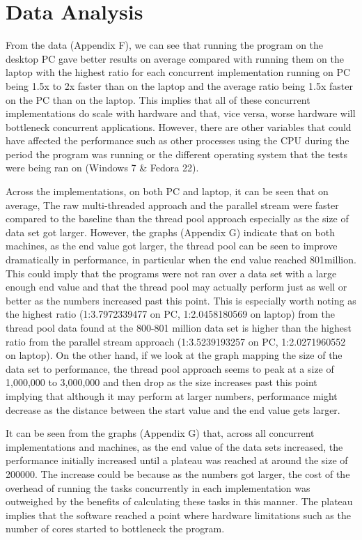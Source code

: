 \documentclass[]{report}
\begin{document}
\section{Data Analysis}

From the data (Appendix F), we can see that running the program on the desktop PC gave better results on average compared with running them on the laptop with the highest ratio for each concurrent implementation running on PC being 1.5x to 2x faster than on the laptop and the average ratio being 1.5x faster on the PC than on the laptop. This implies that all of these concurrent implementations do scale with hardware and that, vice versa, worse hardware will bottleneck concurrent applications. However, there are other variables that could have affected the performance such as other processes using the CPU during the period the program was running or the different operating system that the tests were being ran on (Windows 7 \& Fedora 22).

Across the implementations, on both PC and laptop, it can be seen that on average, The raw multi-threaded approach and the parallel stream were faster compared to the baseline than the thread pool approach especially as the size of data set got larger. However, the graphs (Appendix G) indicate that on both machines, as the end value got larger, the thread pool can be seen to improve dramatically in performance, in particular when the end value reached 801million. This could imply that the programs were not ran over a data set with a large enough end value and that the thread pool may actually perform just as well or better as the numbers increased past this point. This is especially worth noting as the highest ratio (1:3.7972339477 on PC, 1:2.0458180569 on laptop) from the thread pool data found at the 800-801 million data set is higher than the highest ratio from the parallel stream approach (1:3.5239193257 on PC, 1:2.0271960552 on laptop). On the other hand, if we look at the graph mapping the size of the data set to performance, the thread pool approach seems to peak at a size of 1,000,000 to 3,000,000 and then drop as the size increases past this point implying that although it may perform at larger numbers, performance might decrease as the distance between the start value and the end value gets larger. 

It can be seen from the graphs (Appendix G) that, across all concurrent implementations and machines, as the end value of the data sets increased, the performance initially increased until a plateau was reached at around the size of 200000. The increase could be because as the numbers got larger, the cost of the overhead of running the tasks concurrently in each implementation was outweighed by the benefits of calculating these tasks in this manner. The plateau implies that the software reached a point where hardware limitations such as the number of cores started to bottleneck the program. 
\end{document}
